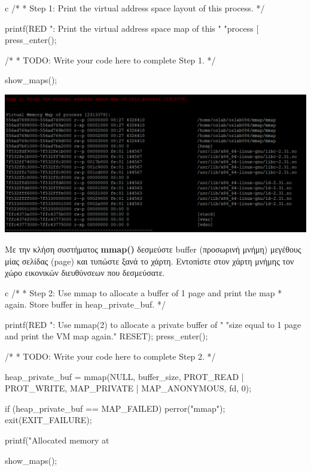\documentclass[12pt]{article}
\begin{document}
\begin{codeless}{c}
    /*
	 * Step 1: Print the virtual address space layout of this process.
	 */

	printf(RED ": Print the virtual address space map of this "
		"process [%
	press_enter();

	/*
	 * TODO: Write your code here to complete Step 1.
	 */	

	show_maps();
\end{codeless}

\centerline{\includegraphics[width=1\textwidth]{3_1_1.png}}

\begin{question}
Με την κλήση συστήματος \textbf{mmap()} δεσμεύστε buffer (προσωρινή μνήμη) μεγέθους
μίας σελίδας (page) και τυπώστε ξανά το χάρτη. Εντοπίστε στον χάρτη μνήμης τον
χώρο εικονικών διευθύνσεων που δεσμεύσατε.
\end{question}

\begin{codeless}{c}
    /*
	 * Step 2: Use mmap to allocate a buffer of 1 page and print the map
	 * again. Store buffer in heap_private_buf.
	 */

	printf(RED ": Use mmap(2) to allocate a private buffer of "
		"size equal to 1 page and print the VM map again.\n" RESET);
	press_enter();

	/*
	 * TODO: Write your code here to complete Step 2.
	 */

	heap_private_buf = mmap(NULL, buffer_size, PROT_READ | PROT_WRITE, MAP_PRIVATE | MAP_ANONYMOUS, fd, 0);

   	if (heap_private_buf == MAP_FAILED) 
    {
        perror("mmap");
        exit(EXIT_FAILURE);
    }
	
    printf("Allocated memory at %

    show_maps();
\end{codeless}
\end{document}
